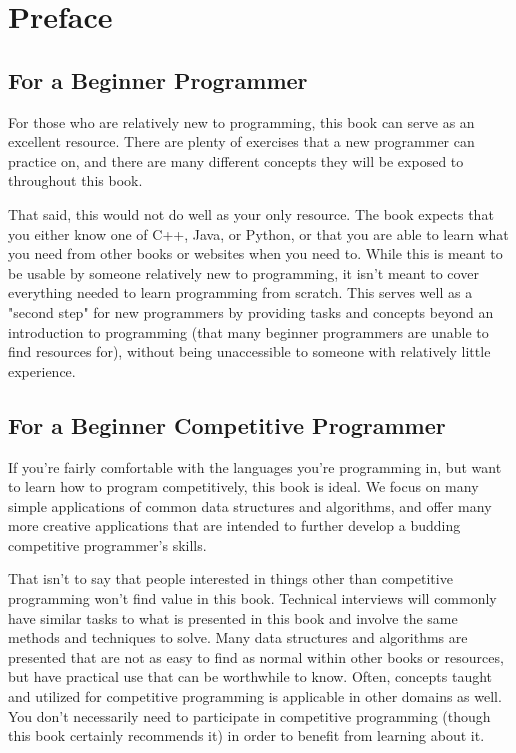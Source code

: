 \section*{Preface}

\subsection*{For a Beginner Programmer}

For those who are relatively new to programming, this book can serve as an excellent resource. There are plenty of exercises that a new programmer can practice on, and there are many different concepts they will be exposed to throughout this book.

That said, this would not do well as your only resource. The book expects that you either know one of C++, Java, or Python, or that you are able to learn what you need from other books or websites when you need to. While this is meant to be usable by someone relatively new to programming, it isn't meant to cover everything needed to learn programming from scratch. This serves well as a "second step" for new programmers by providing tasks and concepts beyond an introduction to programming (that many beginner programmers are unable to find resources for), without being unaccessible to someone with relatively little experience.

\subsection*{For a Beginner Competitive Programmer}

If you're fairly comfortable with the languages you're programming in, but want to learn how to program competitively, this book is ideal. We focus on many simple applications of common data structures and algorithms, and offer many more creative applications that are intended to further develop a budding competitive programmer's skills.

That isn't to say that people interested in things other than competitive programming won't find value in this book. Technical interviews will commonly have similar tasks to what is presented in this book and involve the same methods and techniques to solve. Many data structures and algorithms are presented that are not as easy to find as normal within other books or resources, but have practical use that can be worthwhile to know. Often, concepts taught and utilized for competitive programming is applicable in other domains as well. You don't necessarily need to participate in competitive programming (though this book certainly recommends it) in order to benefit from learning about it.

